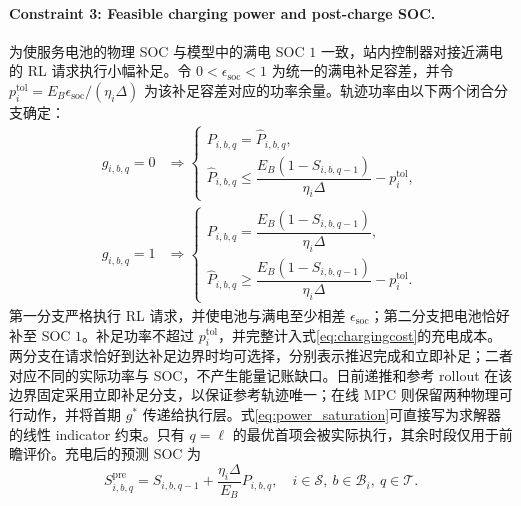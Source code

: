 \documentclass[12pt,a4paper,UTF8]{ctexart}
\begin{document}
\paragraph{Constraint 3: Feasible charging power and post-charge SOC.}
为使服务电池的物理 SOC 与模型中的满电 SOC $1$ 一致，站内控制器对接近满电的 RL 请求执行小幅补足。令 $0<\epsilon_{\mathrm{soc}}<1$ 为统一的满电补足容差，并令
$p_i^{\mathrm{tol}}=E_B\epsilon_{\mathrm{soc}}/(\eta_i\Delta)$
为该补足容差对应的功率余量。轨迹功率由以下两个闭合分支确定：
\begin{subequations}
\label{eq:power_saturation}
\begin{align}
g_{i,b,q}=0
&\Longrightarrow
\begin{cases}
P_{i,b,q}=\widehat P_{i,b,q},\\
\widehat P_{i,b,q}
\le \dfrac{E_B(1-S_{i,b,q-1})}{\eta_i\Delta}
-p_i^{\mathrm{tol}},
\end{cases}
\label{eq:defer_completion}\\
g_{i,b,q}=1
&\Longrightarrow
\begin{cases}
P_{i,b,q}
=\dfrac{E_B(1-S_{i,b,q-1})}{\eta_i\Delta},\\
\widehat P_{i,b,q}
\ge \dfrac{E_B(1-S_{i,b,q-1})}{\eta_i\Delta}
-p_i^{\mathrm{tol}}.
\end{cases}
\label{eq:complete_charging}
\end{align}
\end{subequations}
第一分支严格执行 RL 请求，并使电池与满电至少相差 $\epsilon_{\mathrm{soc}}$；第二分支把电池恰好补至 SOC $1$。补足功率不超过 $p_i^{\mathrm{tol}}$，并完整计入式\eqref{eq:chargingcost}的充电成本。两分支在请求恰好到达补足边界时均可选择，分别表示推迟完成和立即补足；二者对应不同的实际功率与 SOC，不产生能量记账缺口。日前递推和参考 rollout 在该边界固定采用立即补足分支，以保证参考轨迹唯一；在线 MPC 则保留两种物理可行动作，并将首期 $g^*$ 传递给执行层。式\eqref{eq:power_saturation}可直接写为求解器的线性 indicator 约束。只有 $q=\ell$ 的最优首项会被实际执行，其余时段仅用于前瞻评价。充电后的预测 SOC 为
\begin{equation}
S_{i,b,q}^{\mathrm{pre}}
=
S_{i,b,q-1}
+\frac{\eta_i\Delta}{E_B}P_{i,b,q},
\quad i\in\mathcal S,\ b\in\mathcal B_i,\ q\in\mathcal T.
\label{eq:continuous_charging_transition}
\end{equation}
\end{document}
